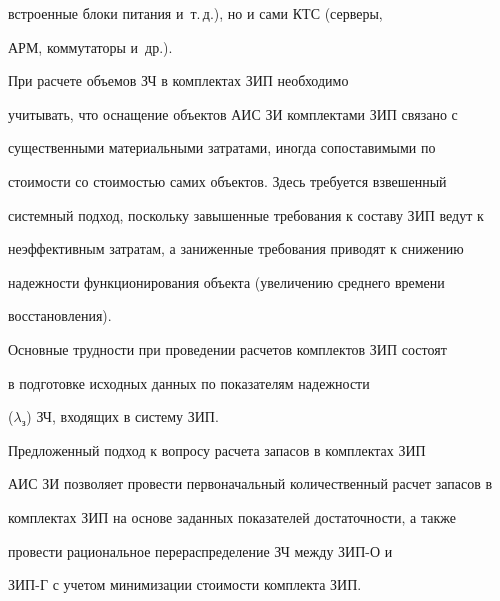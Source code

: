 встроенные блоки питания и~т.\,д.), но и сами КТС (серверы, 


АРМ, коммутаторы и~др.).


     


     При расчете объемов ЗЧ в комплектах ЗИП необходимо 


учитывать, что оснащение объектов АИС ЗИ комплектами ЗИП связано с 


существенными материальными затратами, иногда сопоставимыми по 


стоимости со стои\-мостью самих объектов. Здесь требуется взвешенный 


системный подход, поскольку завышенные требования к составу ЗИП ведут к 


неэффективным затратам, а заниженные требования приводят к снижению 


надежности функционирования объекта (увеличению среднего времени 


восстановления).


     


     Основные трудности при проведении расчетов комплектов ЗИП состоят 


в подготовке исходных данных по показателям надежности 


($\lambda_{\mathrm{з}}$) ЗЧ, входящих в систему ЗИП.


     


     Предложенный подход к вопросу расчета запасов в комплектах ЗИП 


АИС ЗИ позволяет провести первоначальный количественный расчет запасов в 


комплектах ЗИП на основе заданных показателей достаточности, а также 


провести рациональное перераспределение ЗЧ между ЗИП-О и 


ЗИП-Г с учетом минимизации стоимости комплекта ЗИП.





